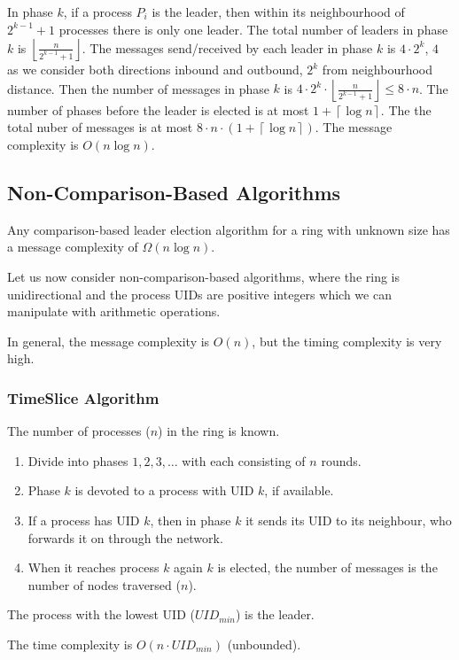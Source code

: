 \documentclass[11pt]{article}
\begin{document}
In phase $k$, if a process $P_i$ is the leader, then within its neighbourhood of $2^{k - 1} + 1$ processes there is only one leader.
The total number of leaders in phase $k$ is $\left\lfloor \frac{n}{2^{k - 1} + 1} \right\rfloor$.
The messages send/received by each leader in phase $k$ is $4 \cdot 2^k$, $4$ as we consider both directions inbound and outbound, $2^k$ from neighbourhood distance.
Then the number of messages in phase $k$ is $4 \cdot 2^k \cdot \left\lfloor \frac{n}{2^{k-1}+1}\right\rfloor \leq 8 \cdot n$.
The number of phases before the leader is elected is at most $1 + \left\lceil \log n \right\rceil$.
The the total nuber of messages is at most $8 \cdot n \cdot (1 + \left\lceil \log n \right\rceil)$.
The message complexity is $O(n \log n)$.

\subsection{Non-Comparison-Based Algorithms}
Any comparison-based leader election algorithm for a ring with unknown size has a message complexity of $\Omega(n \log n)$.

Let us now consider non-comparison-based algorithms, where the ring is unidirectional and the process UIDs are positive integers which we can manipulate with arithmetic operations.

In general, the message complexity is $O(n)$, but the timing complexity is very high.

\subsubsection{TimeSlice Algorithm}
The number of processes ($n$) in the ring is known.
\begin{enumerate}
  \item Divide into phases $1,2,3, \dots$ with each consisting of $n$ rounds.
  \item Phase $k$ is devoted to a process with UID $k$, if available.
  \item If a process has UID $k$, then in phase $k$ it sends its UID to its neighbour, who forwards it on through the network.
  \item When it reaches process $k$ again $k$ is elected, the number of messages is the number of nodes traversed ($n$).
\end{enumerate}
The process with the lowest UID ($UID_{min}$) is the leader.

The time complexity is $O(n \cdot UID_{min})$ (unbounded).
\end{document}
